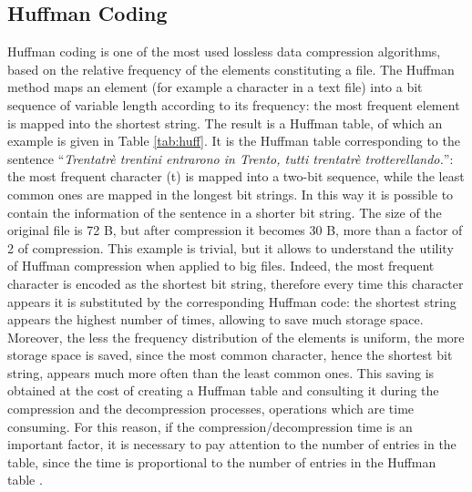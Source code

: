 \subsection{Huffman Coding}
\label{sec:huff}
Huffman coding is one of the most used lossless data compression algorithms, based on the relative frequency of the elements constituting a file. The Huffman method maps an element (for example a character in a text file) into a bit sequence of variable length according to its frequency: the most frequent element is mapped into the shortest string. The result is a Huffman table, of which an example is given in Table \ref{tab:huff}. It is the Huffman table corresponding to the sentence ``\textit{Trentatrè trentini entrarono in Trento, tutti trentatrè trotterellando.}'': the most frequent character (t) is mapped into a two-bit sequence, while the least common ones are mapped in the longest bit strings. In this way it is possible to contain the information of the sentence in a shorter bit string. The size of the original file is 72 B, but after compression it becomes 30 B, more than a factor of 2 of compression. This example is trivial, but it allows to understand the utility of Huffman compression when applied to big files. Indeed, the most frequent character is encoded as the shortest bit string, therefore every time this character appears it is substituted by the corresponding Huffman code: the shortest string appears the highest number of times, allowing to save much storage space. Moreover, the less the frequency distribution of the elements is uniform, the more storage space is saved, since the most common character, hence the shortest bit string, appears much more often than the least common ones. This saving is obtained at the cost of creating a Huffman table and consulting it during the compression and the decompression processes, operations which are time consuming. For this reason, if the compression/decompression time is an important factor, it is necessary to pay attention to the number of entries in the table, since the time is proportional to the number of entries in the Huffman table \cite{huffman}.
%
